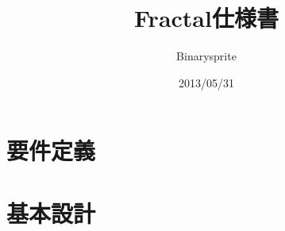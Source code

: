 \documentclass[a4paper,10pt,onecolumn]{jsbook}
\title{Fractal仕様書}
\author{Binarysprite}
\date{2013/05/31}
\begin{document}
\maketitle
\tableofcontents


\part{要件定義}
    
    

\part{基本設計}
    
    
    
\end{document}
